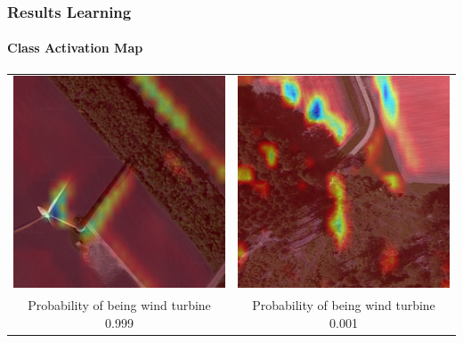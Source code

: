\documentclass[color=usenames,dvipsnames]{beamer}
\begin{document}
\begin{frame}
\frametitle{Results Learning}
\framesubtitle{Class Activation Map}


\begin{centering}

\begin{table}[ht]
\centering
\begin{tabular}{cc}

\includegraphics[width=0.4\linewidth]{../figures/heatmap_turbine.png}&
\includegraphics[width=0.4\linewidth]{../figures/heatmap_no_turbine.png}\\
\small {Probability of being wind turbine 0.999} &
\small {Probability of being wind turbine 0.001} \\

\end{tabular}
\end{table}


\end{centering}


\end{frame}
\end{document}
